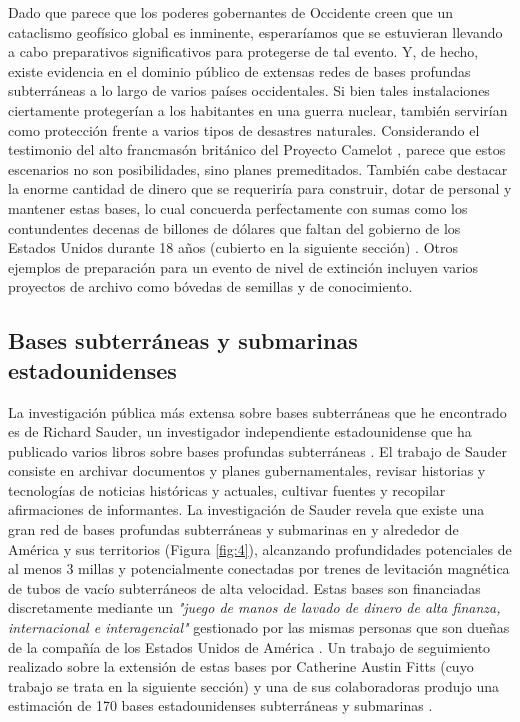 \documentclass[10pt,twocolumn,letterpaper]{article}
\begin{document}
Dado que parece que los poderes gobernantes de Occidente creen que un cataclismo geofísico global es inminente, esperaríamos que se estuvieran llevando a cabo preparativos significativos para protegerse de tal evento. Y, de hecho, existe evidencia en el dominio público de extensas redes de bases profundas subterráneas a lo largo de varios países occidentales. Si bien tales instalaciones ciertamente protegerían a los habitantes en una guerra nuclear, también servirían como protección frente a varios tipos de desastres naturales. Considerando el testimonio del alto francmasón británico del Proyecto Camelot \cite{4,6}, parece que estos escenarios no son posibilidades, sino planes premeditados. También cabe destacar la enorme cantidad de dinero que se requeriría para construir, dotar de personal y mantener estas bases, lo cual concuerda perfectamente con sumas como los contundentes decenas de billones de dólares que faltan del gobierno de los Estados Unidos durante 18 años (cubierto en la siguiente sección) \cite{11,12,13}. Otros ejemplos de preparación para un evento de nivel de extinción incluyen varios proyectos de archivo como bóvedas de semillas y de conocimiento.

\subsection{Bases subterráneas y submarinas estadounidenses}

La investigación pública más extensa sobre bases subterráneas que he encontrado es de Richard Sauder, un investigador independiente estadounidense que ha publicado varios libros sobre bases profundas subterráneas \cite{22}. El trabajo de Sauder consiste en archivar documentos y planes gubernamentales, revisar historias y tecnologías de noticias históricas y actuales, cultivar fuentes y recopilar afirmaciones de informantes. La investigación de Sauder revela que existe una gran red de bases profundas subterráneas y submarinas en y alrededor de América y sus territorios (Figura \ref{fig:4}), alcanzando profundidades potenciales de al menos 3 millas y potencialmente conectadas por trenes de levitación magnética de tubos de vacío subterráneos de alta velocidad. Estas bases son financiadas discretamente mediante un \textit{"juego de manos de lavado de dinero de alta finanza, internacional e interagencial"} gestionado por las mismas personas que son dueñas de la compañía de los Estados Unidos de América \cite{22}. Un trabajo de seguimiento realizado sobre la extensión de estas bases por Catherine Austin Fitts (cuyo trabajo se trata en la siguiente sección) y una de sus colaboradoras produjo una estimación de 170 bases estadounidenses subterráneas y submarinas \cite{16,20}.
\end{document}
